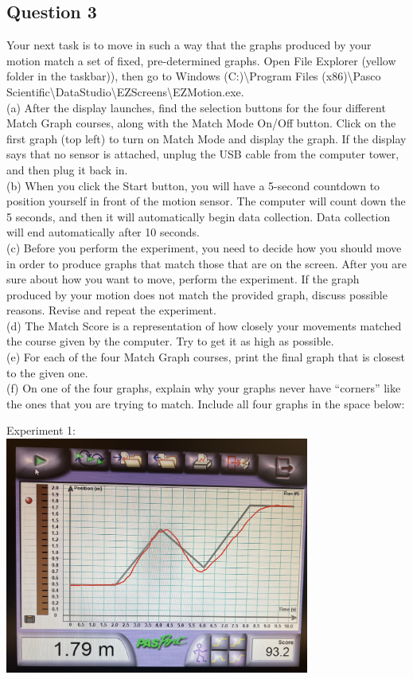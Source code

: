 \documentclass[8pt]{extarticle}
\begin{document}
{\subsection*{Question 3}
Your next task is to move in such a way that the graphs produced by your motion match a set of fixed, pre-determined graphs.  Open File Explorer (yellow folder in the taskbar)), then go to Windows (C:)\textbackslash Program Files (x86)\textbackslash Pasco Scientific\textbackslash DataStudio\textbackslash EZScreens\textbackslash EZMotion.exe. \\
(a) After the display launches, find the selection buttons for the four different Match Graph courses, along with the Match Mode On/Off button.  Click on the first graph (top left) to turn on Match Mode and display the graph.  If the display says that no sensor is attached, unplug the USB cable from the computer tower, and then plug it back in. \\
(b) When you click the Start button, you will have a 5-second countdown to position yourself in front of the motion sensor.  The computer will count down the 5 seconds, and then it will automatically begin data collection.  Data collection will end automatically after 10 seconds. \\
(c) Before you perform the experiment, you need to decide how you should move in order to produce graphs that match those that are on the screen.  After you are sure about how you want to move, perform the experiment.  If the graph produced by your motion does not match the provided graph, discuss possible reasons.  Revise and repeat the experiment. \\
(d) The Match Score is a representation of how closely your movements matched the course given by the computer.  Try to get it as high as possible. \\
(e) For each of the four Match Graph courses, print the final graph that is closest to the given one. \\
(f) On one of the four graphs, explain why your graphs never have “corners” like the ones that you are trying to match.
Include all four graphs in the space below: \\
\begin{center}
	Experiment 1: \\
	\includegraphics[width=10cm]{Lab2Image1_3_1}\\

\end{center}}
\end{document}
